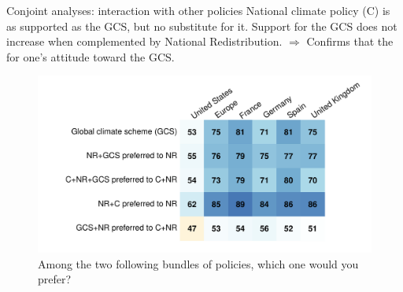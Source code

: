 \begin{framefont}{\small}
\begin{frame}{Conjoint analyses: interaction with other policies\label{}} 
    \bbvs \ip National climate policy (C) is as supported as the GCS, but no substitute for it.
	\ip Support for the GCS does not increase when complemented by National Redistribution.
	\ip $\Rightarrow$ Confirms that the  for one's attitude toward the GCS.
    \ee
    \begin{figure} \vspace*{-.5cm}
        \centering 
        \caption{Among the two following bundles of policies, which one would you prefer?}
        \vspace{-.2cm} 
        \includegraphics[height=.7\textheight]{../figures/country_comparison/conjoint_ab_positive.pdf} 
    \end{figure}
\end{frame}


\end{framefont}
